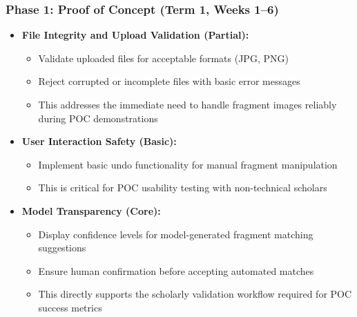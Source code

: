 \documentclass{article}
\begin{document}
\subsubsection{Phase 1: Proof of Concept (Term 1, Weeks 1--6)}
\begin{itemize}
    \item \textbf{File Integrity and Upload Validation (Partial):}
    \begin{itemize}
        \item Validate uploaded files for acceptable formats (JPG, PNG)
        \item Reject corrupted or incomplete files with basic error messages
        \item This addresses the immediate need to handle fragment images reliably during POC demonstrations
    \end{itemize}

    \item \textbf{User Interaction Safety (Basic):}
    \begin{itemize}
        \item Implement basic undo functionality for manual fragment manipulation
        \item This is critical for POC usability testing with non-technical scholars
    \end{itemize}

    \item \textbf{Model Transparency (Core):}
    \begin{itemize}
        \item Display confidence levels for model-generated fragment matching suggestions
        \item Ensure human confirmation before accepting automated matches
        \item This directly supports the scholarly validation workflow required for POC success metrics
    \end{itemize}
\end{itemize}
\end{document}
